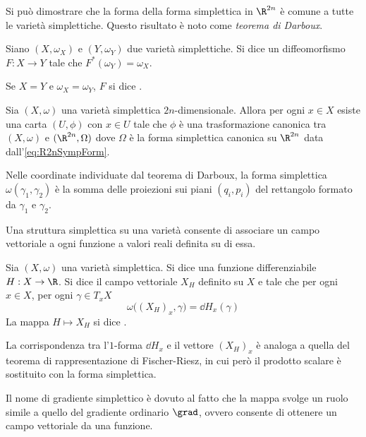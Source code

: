 Si può dimostrare che la forma della forma simplettica in $\R^{2n}$ è comune a tutte le varietà simplettiche. Questo risultato è noto come \emph{teorema di Darboux}.

\begin{definition}
  Siano $(X, \omega_X)$ e $(Y, \omega_Y)$ due varietà simplettiche. Si dice  un diffeomorfismo $F:X\to Y$ tale che $F^*(\omega_Y) = \omega_X$. 
\end{definition}
\begin{remark}
  Se $X = Y$ e $\omega_X = \omega_Y$, $F$ si dice .
\end{remark}
\begin{theorem}[Darboux]
  Sia $(X,\omega)$ una varietà simplettica $2n$-dimensionale. Allora per ogni $x \in X$ esiste una carta $(U,\phi)$ con $x \in U$ tale che $\phi$ è una trasformazione canonica tra $(X,\omega)$ e $(\R^{2n}, \Omega)$ dove $\Omega$ è la forma simplettica canonica su $\R^{2n}$ data dall'\autoref{eq:R2nSympForm}.
\end{theorem}
\begin{remark}
  Nelle coordinate individuate dal teorema di Darboux, la forma simplettica $\omega(\gamma_1,\gamma_2)$ è la somma delle proiezioni sui piani $(q_i, p_i)$ del rettangolo formato da $\gamma_1$ e $\gamma_2$.
\end{remark}

Una struttura simplettica su una varietà consente di associare un campo vettoriale a ogni funzione a valori reali definita su di essa. 
\begin{definition} \label{def:hamField}
  Sia $(X, \omega)$ una varietà simplettica. Si dice  una funzione differenziabile $H: X \to \R$. Si dice  il campo vettoriale $X_H$ definito su $X$ e tale che per ogni $x \in X$, per ogni $\gamma \in T_x X$
  \begin{equation} \label{eq:hamField}
    \omega\big((X_H)_x, \gamma\big) = \dd{H}_x(\gamma)
  \end{equation}
  La mappa $H \mapsto X_H$ si dice .
\end{definition}
\begin{remark}
  La corrispondenza tra l'$1$-forma $\dd{H}_x$ e il vettore $(X_H)_x$ è analoga a quella del teorema di rappresentazione di Fischer-Riesz, in cui però il prodotto scalare è sostituito con la forma simplettica.
\end{remark}
\begin{remark}
  Il nome di gradiente simplettico è dovuto al fatto che la mappa svolge un ruolo simile a quello del gradiente ordinario $\grad$, ovvero consente di ottenere un campo vettoriale da una funzione.
\end{remark}

